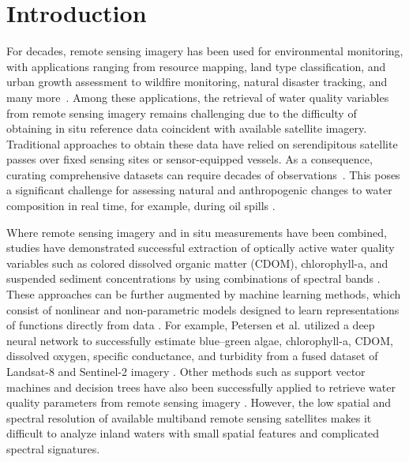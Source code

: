 \documentclass[remotesensing,article,accept,pdftex,moreauthors]{Definitions/mdpi}
\begin{document}
\section{Introduction}

For decades, remote sensing imagery has been used for environmental monitoring, with applications ranging from resource mapping, land type classification, and urban growth assessment to wildfire monitoring, natural disaster tracking, and many more~\cite{melesse2007remote, joyce2009review}. Among these applications, the retrieval of water quality variables from remote sensing imagery remains challenging due to the difficulty of obtaining in situ reference data coincident with available satellite imagery. Traditional approaches to obtain these data have relied on serendipitous satellite passes over fixed sensing sites or sensor-equipped vessels. As a consequence, curating comprehensive datasets can require decades of observations~\cite{aurin2018remote, ross2019aquasat}. This poses a significant challenge for assessing natural and anthropogenic changes to water composition in real time, for example, during oil spills \cite{fingas2017review}.

Where remote sensing imagery and in situ measurements have been combined, studies have demonstrated successful extraction of optically active water quality variables such as colored dissolved organic matter (CDOM), chlorophyll-a, and suspended sediment concentrations by using combinations of spectral bands \cite{remote-sensing-finland,bonansea2015using, absalon2023detection}. These approaches can be further augmented by machine learning methods, which consist of nonlinear and non-parametric models designed to learn representations of functions directly from data \cite{lary2010artificial}. For example, Petersen et al. utilized a deep neural network to successfully estimate blue--green algae, chlorophyll-a, CDOM, dissolved oxygen, specific conductance, and turbidity from a fused dataset of Landsat-8 and Sentinel-2 imagery \cite{peterson2020deep}. Other methods such as support vector machines and decision trees have also been successfully applied to retrieve water quality parameters from remote sensing imagery \cite{belgiu2016random,sagan2020monitoring}. However, the low spatial and spectral resolution of available multiband remote sensing satellites makes it difficult to analyze inland waters with small spatial features and complicated spectral signatures. 
\end{document}
